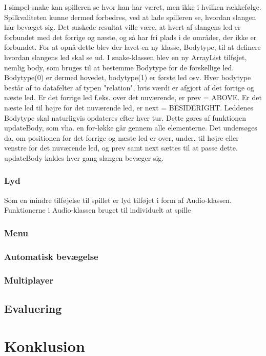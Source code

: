 \documentclass{report}
\begin{document}
I simpel-snake kan spilleren se hvor han har været, men ikke i hvilken rækkefølge. Spilkvaliteten kunne dermed forbedres, ved at lade spilleren se, hvordan slangen har bevæget sig. Det ønskede resultat ville være, at hvert af slangens led er forbundet med det forrige og næste, og så har fri plads i de områder, der ikke er forbundet.
For at opnå dette blev der lavet en ny klasse, Bodytype, til at definere hvordan slangens led skal se ud. I snake-klassen blev en ny ArrayList tilføjet, nemlig body, som bruges til at bestemme Bodytype for de forskellige led. Bodytype(0) er dermed hovedet, bodytype(1) er første led osv. Hver bodytype består af to datafelter af typen "relation", hvis værdi er afgjort af det forrige og næste led. Er det forrige led f.eks. over det nuværende, er prev = ABOVE. Er det næste led til højre for det nuværende led, er next = BESIDERIGHT.
Leddenes Bodytype skal naturligvis opdateres efter hver tur. Dette gøres af funktionen updateBody, som vha. en for-løkke går gennem alle elementerne. Det undersøges da, om positionen for det forrige og næste led er over, under, til højre eller venstre for det nuværende led, og prev samt next sættes til at passe dette. updateBody kaldes hver gang slangen bevæger sig.

\subsection{Lyd}

Som en mindre tilføjelse til spillet er lyd tilføjet i form af Audio-klassen. Funktionerne i Audio-klassen bruget til individuelt at spille 	

\subsection{Menu}

\subsection{Automatisk bevægelse}

\subsection{Multiplayer}

\section{Evaluering}

\chapter{Konklusion}
\end{document}
